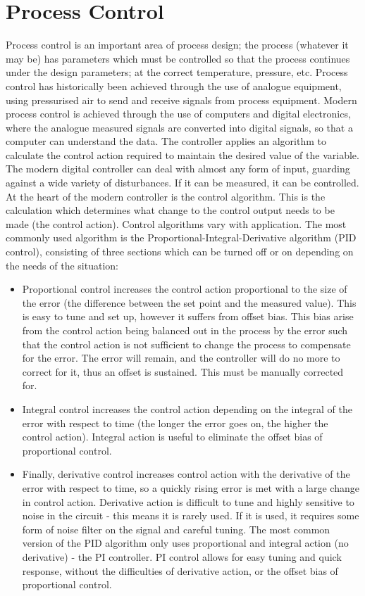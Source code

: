 \documentclass[twoside,a4]{report}
\def\br{\newline \newline \noindent}
\begin{document}
	\section*{Process Control}
	Process control is an important area of process design; the process (whatever it may be) has parameters which must be controlled so that the process continues under the design parameters; at the correct temperature, pressure, etc. Process control has historically been achieved through the use of analogue equipment, using pressurised air to send and receive signals from process equipment. Modern process control is achieved through the use of computers and digital electronics, where the analogue measured signals are converted into digital signals, so that a computer can understand the data. The controller applies an algorithm to calculate the control action required to maintain the desired value of the variable. The modern digital controller can deal with almost any form of input, guarding against a wide variety of disturbances. If it can be measured, it can be controlled.
	\br
	At the heart of the modern controller is the control algorithm. This is the calculation which determines what change to the control output needs to be made (the control action). Control algorithms vary with application. The most commonly used algorithm is the Proportional-Integral-Derivative algorithm (PID control), consisting of three sections which can be turned off or on depending on the needs of the situation:
	\begin{itemize}
		\item Proportional control increases the control action proportional to the size of the error (the difference between the set point and the measured value). This is easy to tune and set up, however it suffers from offset bias. This bias arise from the control action being balanced out in the process by the error such that the control action is not sufficient to change the process to compensate for the error. The error will remain, and the controller will do no more to correct for it, thus an offset is sustained. This must be manually corrected for.
		\item Integral control increases the control action depending on the integral of the error with respect to time (the longer the error goes on, the higher the control action). Integral action is useful to eliminate the offset bias of proportional control.
		\item Finally, derivative control increases control action with the derivative of the error with respect to time, so a quickly rising error is met with a large change in control action. Derivative action is difficult to tune and highly sensitive to noise in the circuit - this means it is rarely used. If it is used, it requires some form of noise filter on the signal and careful tuning. The most common version of the PID algorithm only uses proportional and integral action (no derivative) - the PI controller. PI control allows for easy tuning and quick response, without the difficulties of derivative action, or the offset bias of proportional control.
	\end{itemize}
\end{document}
